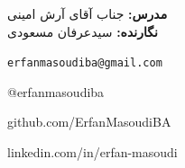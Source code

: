 \documentclass[12pt, a4paper]{article}
\begin{document}
\begin{titlepage}
\begin{center}
    \vspace{1.5cm}
    \begin{minipage}{0.6\textwidth}
        \centering
        \large
        \faUser\ \textbf{مدرس:} جناب آقای آرش امینی \\[0.4cm]
        \faUserGraduate\ \textbf{نگارنده:} سیدعرفان مسعودی
    \end{minipage}
\end{center}

\vfill

\begin{tcolorbox}[
    enhanced,
    colback=lightbg,
    colframe=rulegray,
    arc=3mm,
    boxrule=0.5pt,
    left=10pt, right=10pt, top=12pt, bottom=12pt
]
    \centering
    \small
    \begin{minipage}{0.46\textwidth}
        \centering \faEnvelope\ \texttt{erfanmasoudiba@gmail.com}
    \end{minipage}%
    \begin{minipage}{0.46\textwidth}
        \centering \faTelegram\ @erfanmasoudiba
    \end{minipage}

    \vspace{0.35cm}

    \begin{minipage}{0.46\textwidth}
        \centering \faGithub\ github.com/ErfanMasoudiBA
    \end{minipage}%
    \begin{minipage}{0.46\textwidth}
        \centering \faLinkedin\ linkedin.com/in/erfan-masoudi
    \end{minipage}
\end{tcolorbox}

\vspace{0.8cm}

\end{titlepage}
\restoregeometry

\newpage
\tableofcontents
\newpage

\setcounter{page}{1}

 
\clearpage
 
\clearpage
 
\clearpage
 
\clearpage
 
\clearpage
\end{document}
